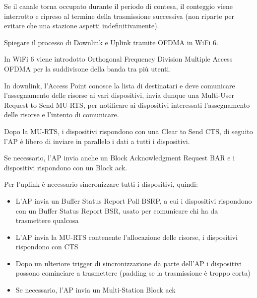 \begin{questions}
\begin{solution}
        Se il canale torna occupato durante il periodo di contesa, il conteggio viene interrotto e ripreso al termine della trasmissione successiva (non riparte per evitare che una stazione aspetti indefinitivamente).
    \end{solution}
    
    \question Spiegare il processo di Downlink e Uplink tramite OFDMA in WiFi 6.
    
    \begin{solution}
        In WiFi 6 viene introdotto Orthogonal Frequency Division Multiple Access OFDMA per la suddivisone della banda tra più utenti. 
        
        In downlink, l'Access Point conosce la lista di destinatari e deve comunicare l'assegnamento delle risorse ai vari dispositivi, invia dunque una Multi-User Request to Send MU-RTS, per notificare ai dispositivi interessati l'assegnamento delle risorse e l'intento di comunicare.
        
        Dopo la MU-RTS, i dispositivi rispondono con una Clear to Send CTS, di seguito l'AP è libero di inviare in parallelo i dati a tutti i dispositivi.
        
        Se necessario, l'AP invia anche un Block Acknowledgment Request BAR e i dispositivi rispondono con un Block ack.
        
        Per l'uplink è necessario sincronizzare tutti i dispositivi, quindi: 
        \begin{itemize}
            \item L'AP invia un Buffer Status Report Poll BSRP, a cui i dispositivi rispondono con un Buffer Status Report BSR, usato per comunicare chi ha da trasmettere qualcosa
            
            \item L'AP invia la MU-RTS contenente l'allocazione delle risorse, i dispositivi rispondono con CTS
            
            \item Dopo un ulteriore trigger di sincronizzazione da parte dell'AP i dispositivi possono cominciare a trasmettere (padding se la trasmissione è troppo corta)
            
            \item Se necessario, l'AP invia un Multi-Station Block ack
        \end{itemize}
    \end{solution}
\end{questions}
